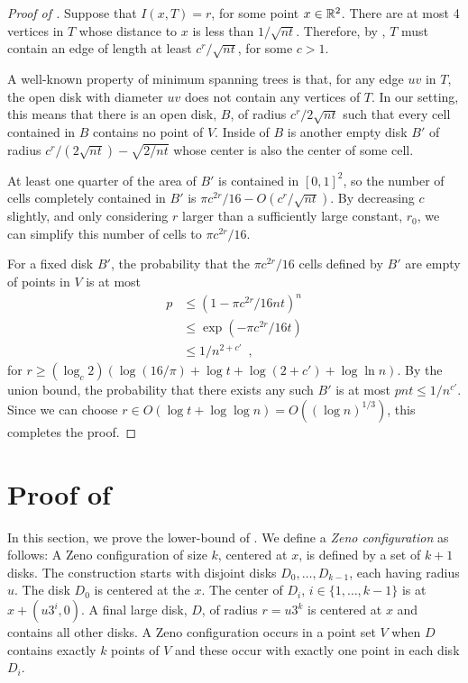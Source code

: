 \documentclass{patmorin}
\begin{document}
\begin{proof}[Proof of ]
Suppose that $I(x,T)=r$, for some point $x\in\mathbb{R}^2$.  There are at most
4 vertices in $T$ whose distance to $x$ is less than $1/\sqrt{nt}$.
Therefore, by , $T$ must contain an edge of length at least
$c^r/\sqrt{nt}$, for some $c>1$.  

A well-known property of minimum spanning trees is that, for any edge
$uv$ in $T$, the open disk with diameter $uv$ does not contain any
vertices of $T$.  In our setting, this means that there is an open disk,
$B$, of radius $c^r/2\sqrt{nt}$ such that every cell contained in $B$
contains no point of $V$.  Inside of $B$ is another empty disk $B'$ of
radius $c^r/(2\sqrt{nt})-\sqrt{2/nt}$ whose center is also the center
of some cell.

At least one quarter of the area of $B'$ is contained in $[0,1]^2$,
so the number of cells completely contained in $B'$ is $\pi c^{2r}/16 -
O(c^{r}/\sqrt{nt})$.  By decreasing $c$ slightly, and only considering
$r$ larger than a sufficiently large constant, $r_0$, we can simplify
this number of cells to $\pi c^{2r}/16$.

For a fixed disk $B'$, the probability that the $\pi c^{2r}/16$ cells
defined by $B'$ are empty of points in $V$ is at most
\begin{align*}
 p 
  & \le (1-\pi c^{2r}/{16nt})^{n} \\
  & \le \exp(-\pi c^{2r}/16t) \\
 & \le 1/n^{2+c'} \enspace ,
\end{align*}
for $r\ge(\log_c2)(\log(16/\pi)+\log t + \log(2+c')+\log\ln n)$.  By the union bound, the
probability that there exists any such $B'$ is at most
$pnt\le 1/n^{c'}$.  Since we can choose $r\in O(\log t+\log\log n) = O((\log
n)^{1/3})$, this completes the proof.
\end{proof}

\section{Proof of }

In this section, we prove the lower-bound of .  We define
a \emph{Zeno configuration} as follows:  A Zeno
configuration of size $k$, centered at $x$, is defined by a set of $k+1$ disks.
The construction starts with disjoint disks $D_0,\ldots,D_{k-1}$, each
having radius $u$.  The disk $D_0$ is centered at the $x$.  The center
of $D_i$, $i\in\{1,\ldots,k-1\}$ is at $x+(u3^i, 0)$.  A final large disk,
$D$, of radius $r=u3^k$ is centered at $x$ and contains all
other disks.  A Zeno configuration occurs in a point set $V$ when $D$
contains exactly $k$ points of $V$ and these occur with exactly one
point in each disk $D_i$.
\end{document}
